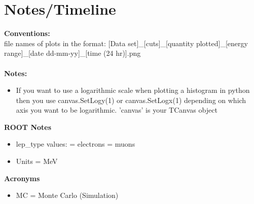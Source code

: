 \documentclass[11pt]{article}
\begin{document}
    \maketitle
    \section{Notes/Timeline}
    \textbf{Conventions:}\\
    file names of plots in the format: [Data set]\_[cuts]\_[quantity plotted]\_[energy range]\_[date dd-mm-yy]\_[time (24 hr)].png
    \\\\
    \textbf{Notes:}
    \begin{itemize}
        \item If you want to use a logarithmic scale when plotting a histogram in python then you use canvas.SetLogy(1) or canvas.SetLogx(1) depending on which axis you want to be logarithmic. 'canvas' is your TCanvas object
    \end{itemize}
    \textbf{ROOT Notes}
    \begin{itemize}
        \item lep\_type values:
         = electrons
         = muons

        \item Units = MeV
    \end{itemize}
    \textbf{Acronyms}
    \begin{itemize}
        \item MC = Monte Carlo (Simulation)
    \end{itemize}
    

    \newpage
    

    \newpage
    

    \newpage
    

    \newpage
    
\end{document}
